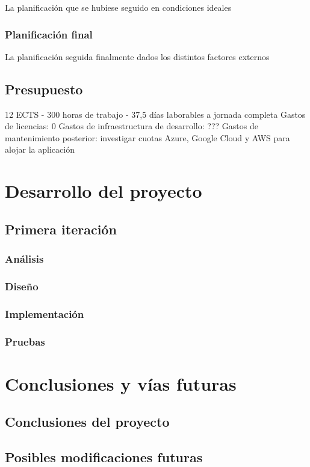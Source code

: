\documentclass[10pt, a4paper]{aqademic}
\begin{document}
La planificación que se hubiese seguido en condiciones ideales

\subsection{Planificación final}

La planificación seguida finalmente dados los distintos factores externos



\section{Presupuesto}

12 ECTS - 300 horas de trabajo - 37,5 días laborables a jornada completa
Gastos de licencias: 0
Gastos de infraestructura de desarrollo: ???
Gastos de mantenimiento posterior: investigar cuotas Azure, Google Cloud y AWS para alojar la aplicación



\chapter{Desarrollo del proyecto}

\section{Primera iteración}

\subsection{Análisis}

\subsection{Diseño}

\subsection{Implementación}

\subsection{Pruebas}


\chapter{Conclusiones y vías futuras}

\section{Conclusiones del proyecto}

\section{Posibles modificaciones futuras}

\newpage



\end{document}
